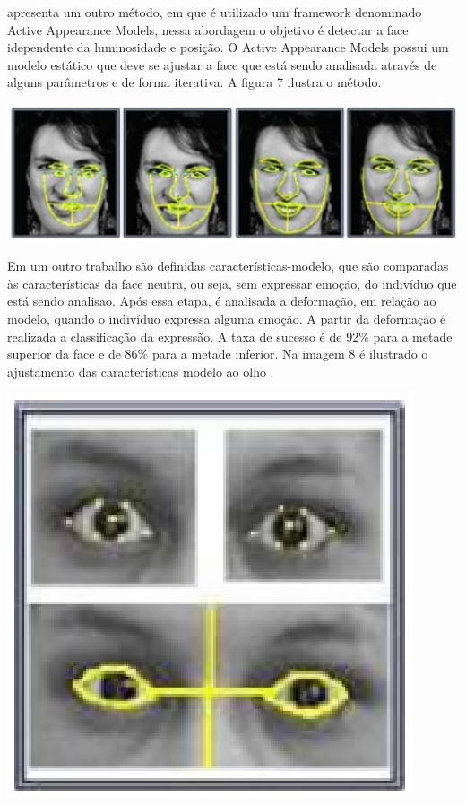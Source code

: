 \cite{Edwards} apresenta um outro método, em que é utilizado um framework denominado Active Appearance Models, nessa abordagem o objetivo é detectar a face idependente da luminosidade e posição. O  Active Appearance Models
possui um modelo estático que deve se ajustar a face que está sendo analisada através de alguns parâmetros e de forma iterativa. A figura 7 ilustra o método.
\begin{center}
	\includegraphics[scale=0.5]{graficos/metodo2_classi}
\end{center}

Em um outro trabalho são definidas características-modelo, que são comparadas às características da face neutra, ou seja, sem expressar emoção, do indivíduo que está sendo analisao. Após essa etapa, é analisada a deformação, em relação ao modelo, quando o indivíduo expressa alguma emoção. A partir da deformação é realizada a classificação da expressão. A taxa de sucesso é de 92\% para a metade superior da face e de
86\% para a metade inferior. Na imagem 8 é ilustrado o ajustamento das características modelo ao olho \cite{Pantic}.
\begin{center}
	\includegraphics[scale=0.5]{graficos/metodo3_classi}
\end{center}

